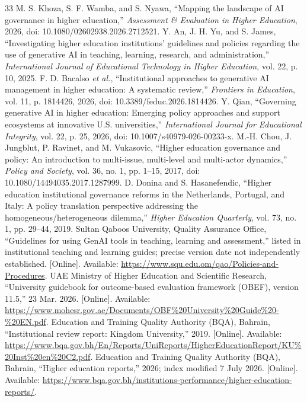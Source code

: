 \documentclass[conference,letterpaper]{IEEEtran}
\begin{document}
\begin{thebibliography}{33}
 M. S. Khoza, S. F. Wamba, and S. Nyawa, ``Mapping the landscape of AI governance in higher education,'' \emph{Assessment \& Evaluation in Higher Education}, 2026, doi: 10.1080/02602938.2026.2712521.
 Y. An, J. H. Yu, and S. James, ``Investigating higher education institutions' guidelines and policies regarding the use of generative AI in teaching, learning, research, and administration,'' \emph{International Journal of Educational Technology in Higher Education}, vol. 22, p. 10, 2025.
 F. D. Bacalso \emph{et al.}, ``Institutional approaches to generative AI management in higher education: A systematic review,'' \emph{Frontiers in Education}, vol. 11, p. 1814426, 2026, doi: 10.3389/feduc.2026.1814426.
 Y. Qian, ``Governing generative AI in higher education: Emerging policy approaches and support ecosystems at innovative U.S. universities,'' \emph{International Journal for Educational Integrity}, vol. 22, p. 25, 2026, doi: 10.1007/s40979-026-00233-x.
 M.-H. Chou, J. Jungblut, P. Ravinet, and M. Vukasovic, ``Higher education governance and policy: An introduction to multi-issue, multi-level and multi-actor dynamics,'' \emph{Policy and Society}, vol. 36, no. 1, pp. 1--15, 2017, doi: 10.1080/14494035.2017.1287999.
 D. Donina and S. Hasanefendic, ``Higher education institutional governance reforms in the Netherlands, Portugal, and Italy: A policy translation perspective addressing the homogeneous/heterogeneous dilemma,'' \emph{Higher Education Quarterly}, vol. 73, no. 1, pp. 29--44, 2019.
 Sultan Qaboos University, Quality Assurance Office, ``Guidelines for using GenAI tools in teaching, learning and assessment,'' listed in institutional teaching and learning guides; precise version date not independently established. [Online]. Available: \url{https://www.squ.edu.om/qao/Policies-and-Procedures}.
 UAE Ministry of Higher Education and Scientific Research, ``University guidebook for outcome-based evaluation framework (OBEF), version 11.5,'' 23 Mar. 2026. [Online]. Available: \url{https://www.mohesr.gov.ae/Documents/OBF%20University%20Guide%20-%20EN.pdf}.
 Education and Training Quality Authority (BQA), Bahrain, ``Institutional review report: Kingdom University,'' 2019. [Online]. Available: \url{https://www.bqa.gov.bh/En/Reports/UniReports/HigherEducationReport/KU%20Inst%20en%20C2.pdf}.
 Education and Training Quality Authority (BQA), Bahrain, ``Higher education reports,'' 2026; index modified 7 July 2026. [Online]. Available: \url{https://www.bqa.gov.bh/institutions-performance/higher-education-reports/}.

\end{thebibliography}
\end{document}
